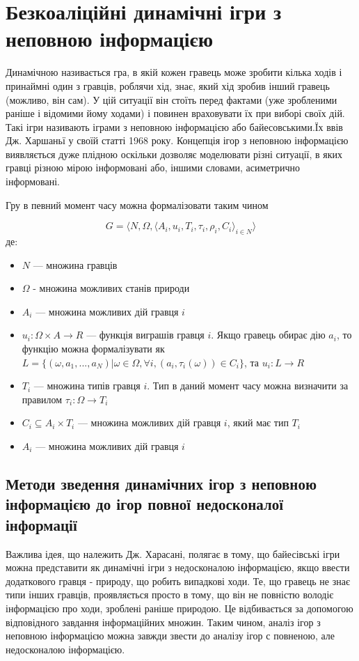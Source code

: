 \chapter{Безкоаліційні динамічні ігри з неповною інформацією}

Динамічною називається гра, в якій кожен гравець може зробити кілька ходів і принаймні один з гравців, роблячи хід, знає, який хід зробив інший гравець (можливо, він сам). У цій ситуації він стоїть перед фактами (уже зробленими раніше і відомими йому ходами) і повинен враховувати їх при виборі своїх дій. Такі ігри називають іграми з неповною інформацією або байесовськими.Їх ввів Дж. Харшаньї у своїй статті 1968 року. Концепція ігор з неповною інформацією виявляється дуже плідною оскільки дозволяє моделювати різні ситуації, в яких гравці різною мірою інформовані або, іншими словами, асиметрично інформовані.

Гру в певний момент часу можна формалізовати таким чином

\begin{equation}
G=\langle N,\Omega,\langle A_i,u_i,T_i,\tau_i,\rho_i,C_i\rangle _{i\in N}\rangle
\end{equation}
де:
\begin{itemize}
\item \(N\) — множина гравців
\item \(\Omega\) - множина можливих станів природи
\item \(A_i\) — множина можливих дій гравця \(i\)
\item \(u_i:\Omega \times A \rightarrow R\) — функція виграшів гравця \(i\). Якщо гравець обирає дію \(a_i\), то функцію можна формалізувати як \\ \(L=\{(\omega,a_1,...,a_N) | \omega \in \Omega, \forall i,(a_i,\tau_i(\omega)) \in C_i\}\), та \(u_i: L \rightarrow R\)
\item \(T_i\) — множина типів гравця \(i\). Тип в даний момент часу можна визначити за правилом \(\tau_i:\Omega \rightarrow T_i\)
\item \(C_i \subseteq A_i \times T_i\) — множина можливих дій гравця \(i\), який має тип \(T_i\)
\item \(A_i\) — множина можливих дій гравця \(i\)


\end{itemize}

\section{Методи зведення динамічних ігор з неповною інформацією до ігор повної недосконалої інформації}

Важлива ідея, що належить Дж. Харасані, полягає в тому, що байесівські ігри можна представити як динамічні ігри з недосконалою інформацією, якщо ввести додаткового гравця - природу, що робить випадкові ходи. Те, що гравець не знає типи інших гравців, проявляється просто в тому, що він не повністю володіє інформацією про ходи, зроблені раніше природою. Це відбивається за допомогою відповідного завдання інформаційних множин. Таким чином, аналіз ігор з неповною інформацією можна завжди звести до аналізу ігор с повненою, але недосконалою інформацією.


